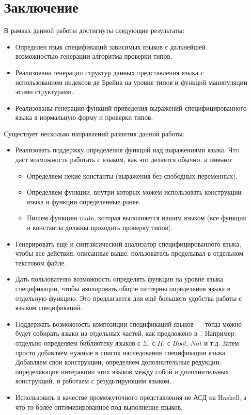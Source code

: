 \documentclass{spbau-diploma}
\begin{document}





\section*{Заключение}

В рамках данной работы достигнуты следующие результаты:
\begin{itemize}
  \item Определен язык спецификаций зависимых языков с дальнейшей возможностью генерации алгоритма проверки типов.
  \item Реализована генерации структур данных представления языка с использованием индексов де Брейна на уровне типов и функций манипуляции этими структурами.
  \item Реализованы генерация функций приведения выражений специфицированного языка в нормальную форму и проверки типов.
\end{itemize}

Существует несколько направлений развития данной работы:
\begin{itemize}
  \item Реализовать поддержку определения функций над выражениями языка. Что даст возможность работать с языком, как это делается обычно, а именно:
  \begin{itemize}
    \item Определяем некие константы (выражения без свободных переменных).
    \item Определяем функции, внутри которых можем использовать конструкции языка и функции определенные ранее.
    \item Пишем функцию main, которая выполняется нашим языком (все функции и константы должны проходить проверку типов).
  \end{itemize}
  \item Генерировать ещё и синтаксический анализатор специфицированного языка, чтобы все действия, описанные выше, пользователь проделывал в отдельном текстовом файле.
  \item Дать пользователю возможность определять функции на уровне языка спецификации, чтобы изолировать общие паттерны определения языка в отдельную функцию. Это предлагается для ещё большего удобства работы с языком спецификаций.
  \item Поддержать возможность композиции спецификаций языков --- тогда можно будет собирать языки из отдельных частей, как предложено в~\cite{isaev}. Например: отдельно определяем библиотеку языков с $\Sigma$, с $\Pi$, с $Bool$, $Nat$ и т.д. Затем просто добавляем нужные в список наследования спецификации языка. Добавляем свои конструкции, определяем дополнительные редукции, определяющие интеракции этих языков между собой и дополнительных конструкций, и работаем с резудьтирующим языком.
  \item Использовать в качестве промежуточного представления\cite{IR} не АСД на Haskell, а что-то более оптимизированное под выполнение языков.
\end{itemize}






\end{document}
